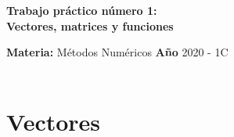 \documentclass[a4paper, 11pt]{article}
\begin{document}
\renewcommand{\listtablename}{Índice de tablas} 
\renewcommand{\tablename}{Tabla}
\begin{center}
\LARGE \bf Trabajo práctico número 1: \\ Vectores, matrices y funciones
\end{center}

\vspace{1cm} 
\noindent\textbf{Materia:} M\'etodos Num\'ericos \hfill
\textbf{Año} 2020 - 1C \\
\hfill \\
\section*{Vectores}
\end{document}
